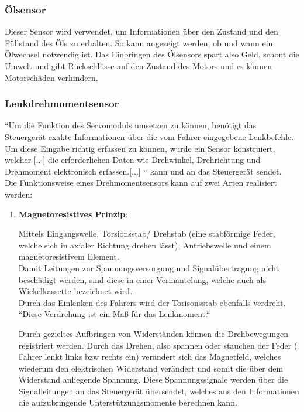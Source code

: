 \begin{flushleft}
	            \subsubsection{Ölsensor}
						
	            Dieser Sensor wird verwendet, um Informationen über den Zustand und den Füllstand des Öls zu erhalten. So kann angezeigt werden, ob und wann ein Ölwechsel notwendig ist. 
	            Das Einbringen des Ölsensors spart also Geld, schont die Umwelt und gibt Rückschlüsse auf den Zustand des Motors und es können Motorschäden verhindern.\cite{TS_oel}
	            
	            \subsubsection{Lenkdrehmomentsensor}
	
	            ``Um die Funktion des Servomoduls umsetzen zu können, benötigt das Steuergerät exakte Informationen über die vom Fahrer eingegebene Lenkbefehle. Um diese Eingabe richtig erfassen zu können, wurde ein Sensor konstruiert, welcher [...] die erforderlichen Daten wie Drehwinkel, Drehrichtung und Drehmoment elektronisch erfassen.[...] ``  \cite{TS_dreh} kann und an das Steuergerät sendet.\\
	            
	            Die Funktionsweise eines Drehmomentsensors kann auf zwei Arten realisiert werden:\\
	            
	            \begin{enumerate}
	                \item \textbf{Magnetoresistives Prinzip}:
	                
	                         Mittels Eingangswelle, Torsionsstab/ Drehstab (eine stabförmige Feder, welche sich in axialer Richtung drehen lässt), Antriebswelle und einem magnetoresistivem Element. \\
	                         Damit Leitungen zur Spannungsversorgung und Signalübertragung nicht beschädigt werden, sind diese in einer Vermantelung, welche auch als Wickelkassette bezeichnet wird.\\
	                         
	                         Durch das Einlenken des Fahrers wird der Torisonsstab ebenfalls verdreht. ``Diese Verdrehung ist ein Maß für das Lenkmoment.`` \cite{TS_dreh}
	
	                         Durch gezieltes Aufbringen von Widerständen können die Drehbewegungen registriert werden. Durch das Drehen, also spannen oder stauchen der Feder ( Fahrer lenkt links bzw rechts ein) verändert sich das Magnetfeld, welches wiederum den elektrischen Widerstand verändert und somit die über dem Widerstand anliegende Spannung. Diese Spannungssignale werden über die Signalleitungen an das Steuergerät übersendet, welches aus den Informationen die aufzubringende Unterstützungsmomente berechnen kann.				 
	

\end{enumerate}
\end{flushleft}
